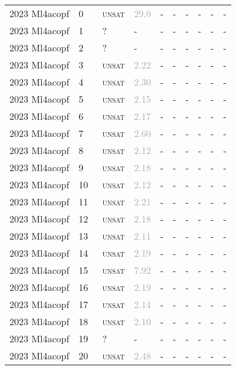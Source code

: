 \begin{center}
{\begin{longtable}{@{}llllllllll@{}}
\midrule
2023 Ml4acopf & 0 & ~\textsc{unsat} & \textcolor{darkgray}{29.0} & - & - & - & - & - & - \\
2023 Ml4acopf & 1 & ~? & - & - & - & - & - & - & - \\
2023 Ml4acopf & 2 & ~? & - & - & - & - & - & - & - \\
2023 Ml4acopf & 3 & ~\textsc{unsat} & \textcolor{darkgray}{2.22} & - & - & - & - & - & - \\
2023 Ml4acopf & 4 & ~\textsc{unsat} & \textcolor{darkgray}{2.30} & - & - & - & - & - & - \\
2023 Ml4acopf & 5 & ~\textsc{unsat} & \textcolor{darkgray}{2.15} & - & - & - & - & - & - \\
2023 Ml4acopf & 6 & ~\textsc{unsat} & \textcolor{darkgray}{2.17} & - & - & - & - & - & - \\
2023 Ml4acopf & 7 & ~\textsc{unsat} & \textcolor{darkgray}{2.60} & - & - & - & - & - & - \\
2023 Ml4acopf & 8 & ~\textsc{unsat} & \textcolor{darkgray}{2.12} & - & - & - & - & - & - \\
2023 Ml4acopf & 9 & ~\textsc{unsat} & \textcolor{darkgray}{2.18} & - & - & - & - & - & - \\
2023 Ml4acopf & 10 & ~\textsc{unsat} & \textcolor{darkgray}{2.12} & - & - & - & - & - & - \\
2023 Ml4acopf & 11 & ~\textsc{unsat} & \textcolor{darkgray}{2.21} & - & - & - & - & - & - \\
2023 Ml4acopf & 12 & ~\textsc{unsat} & \textcolor{darkgray}{2.18} & - & - & - & - & - & - \\
2023 Ml4acopf & 13 & ~\textsc{unsat} & \textcolor{darkgray}{2.11} & - & - & - & - & - & - \\
2023 Ml4acopf & 14 & ~\textsc{unsat} & \textcolor{darkgray}{2.19} & - & - & - & - & - & - \\
2023 Ml4acopf & 15 & ~\textsc{unsat} & \textcolor{darkgray}{7.92} & - & - & - & - & - & - \\
2023 Ml4acopf & 16 & ~\textsc{unsat} & \textcolor{darkgray}{2.19} & - & - & - & - & - & - \\
2023 Ml4acopf & 17 & ~\textsc{unsat} & \textcolor{darkgray}{2.14} & - & - & - & - & - & - \\
2023 Ml4acopf & 18 & ~\textsc{unsat} & \textcolor{darkgray}{2.10} & - & - & - & - & - & - \\
2023 Ml4acopf & 19 & ~? & - & - & - & - & - & - & - \\
2023 Ml4acopf & 20 & ~\textsc{unsat} & \textcolor{darkgray}{2.48} & - & - & - & - & - & - \\

\end{longtable}}
\end{center}
